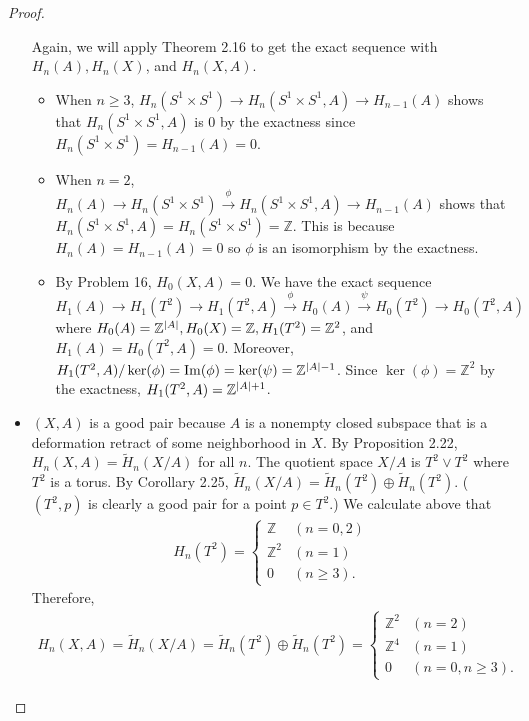\documentclass[12pt, psamsfonts]{amsart}
\theoremstyle{definition}
\theoremstyle{remark}
\numberwithin{equation}{section}
\begin{document}
\begin{proof}
\begin{itemize}
      Again, we will apply Theorem 2.16 to get the exact sequence with $H_n(A), H_n(X)$, and $H_n(X, A)$.
      \begin{itemize}
        \item
          When $n \geq 3$, $H_n(S^1 \times S^1) \rightarrow H_n(S^1 \times S^1, A) \rightarrow H_{n - 1}(A)$ shows that $H_n(S^1 \times S^1, A)$ is 0 by the exactness since $H_n(S^1 \times S^1) = H_{n - 1}(A) = 0$.
        \item
          When $n = 2$, $H_n(A) \rightarrow H_n(S^1 \times S^1) \xrightarrow{\phi} H_n(S^1 \times S^1, A) \rightarrow H_{n - 1}(A)$ shows that $H_n(S^1 \times S^1, A) = H_n(S^1 \times S^1) = \mathbb{Z}$.
          This is because $H_n(A) = H_{n - 1}(A) = 0$ so $\phi$ is an isomorphism by the exactness.
        \item
          By Problem 16, $H_0(X, A) = 0$.
          We have the exact sequence $H_1(A) \rightarrow H_1(T^2) \rightarrow H_1(T^2, A) \xrightarrow{\phi} H_0(A) \xrightarrow{\psi} H_0(T^2) \rightarrow H_0(T^2, A)$ where $H_0(A) = \mathbb{Z}^{\abs{A}}, H_0(X) = \mathbb{Z}, H_1(T^2) = \mathbb{Z}^2$, and $H_1(A) = H_0(T^2, A) = 0$.
          Moreover, $H_1(T^2, A) / \ker(\phi) = \Im(\phi) = \ker(\psi) = \mathbb{Z}^{\abs{A} - 1}$.
          Since $\ker(\phi) = \mathbb{Z}^2$ by the exactness, $H_1(T^2, A) = \mathbb{Z}^{\abs{A} + 1}$.
      \end{itemize}
    \item
      $(X, A)$ is a good pair because $A$ is a nonempty closed subspace that is a deformation retract of some neighborhood in $X$.
      By Proposition 2.22, $H_n(X, A) = \tilde{H}_n(X / A)$ for all $n$.
      The quotient space $X / A$ is $T^2 \vee T^2$ where $T^2$ is a torus.
      By Corollary 2.25, $\tilde{H}_n(X / A) = \tilde{H}_n(T^2) \oplus \tilde{H}_n(T^2)$.
      ($(T^2, p)$ is clearly a good pair for a point $p \in T^2$.)
      We calculate above that
      \begin{align*}
        H_n(T^2) = \begin{cases}
          \mathbb{Z} & (n = 0, 2) \\
          \mathbb{Z}^2 & (n = 1) \\
          0 & (n \geq 3).
        \end{cases}
      \end{align*}
      Therefore,
      \begin{align*}
        H_n(X, A) = \tilde{H}_n(X / A) = \tilde{H}_n(T^2) \oplus \tilde{H}_n(T^2) = \begin{cases}
          \mathbb{Z}^2 & (n = 2) \\
          \mathbb{Z}^4 & (n = 1) \\
          0 & (n = 0, n \geq 3).
        \end{cases}
      \end{align*}


\end{itemize}
\end{proof}
\end{document}
